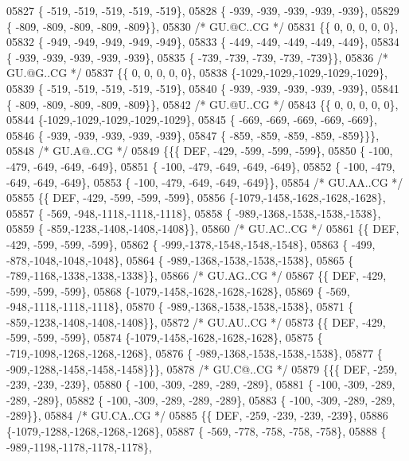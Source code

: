 \begin{DoxyCode}
05827 \{ -519, -519, -519, -519, -519\},
05828 \{ -939, -939, -939, -939, -939\},
05829 \{ -809, -809, -809, -809, -809\}\},
05830 \textcolor{comment}{/* GU.@C..CG */}
05831 \{\{    0,    0,    0,    0,    0\},
05832 \{ -949, -949, -949, -949, -949\},
05833 \{ -449, -449, -449, -449, -449\},
05834 \{ -939, -939, -939, -939, -939\},
05835 \{ -739, -739, -739, -739, -739\}\},
05836 \textcolor{comment}{/* GU.@G..CG */}
05837 \{\{    0,    0,    0,    0,    0\},
05838 \{-1029,-1029,-1029,-1029,-1029\},
05839 \{ -519, -519, -519, -519, -519\},
05840 \{ -939, -939, -939, -939, -939\},
05841 \{ -809, -809, -809, -809, -809\}\},
05842 \textcolor{comment}{/* GU.@U..CG */}
05843 \{\{    0,    0,    0,    0,    0\},
05844 \{-1029,-1029,-1029,-1029,-1029\},
05845 \{ -669, -669, -669, -669, -669\},
05846 \{ -939, -939, -939, -939, -939\},
05847 \{ -859, -859, -859, -859, -859\}\}\},
05848 \textcolor{comment}{/* GU.A@..CG */}
05849 \{\{\{  DEF, -429, -599, -599, -599\},
05850 \{ -100, -479, -649, -649, -649\},
05851 \{ -100, -479, -649, -649, -649\},
05852 \{ -100, -479, -649, -649, -649\},
05853 \{ -100, -479, -649, -649, -649\}\},
05854 \textcolor{comment}{/* GU.AA..CG */}
05855 \{\{  DEF, -429, -599, -599, -599\},
05856 \{-1079,-1458,-1628,-1628,-1628\},
05857 \{ -569, -948,-1118,-1118,-1118\},
05858 \{ -989,-1368,-1538,-1538,-1538\},
05859 \{ -859,-1238,-1408,-1408,-1408\}\},
05860 \textcolor{comment}{/* GU.AC..CG */}
05861 \{\{  DEF, -429, -599, -599, -599\},
05862 \{ -999,-1378,-1548,-1548,-1548\},
05863 \{ -499, -878,-1048,-1048,-1048\},
05864 \{ -989,-1368,-1538,-1538,-1538\},
05865 \{ -789,-1168,-1338,-1338,-1338\}\},
05866 \textcolor{comment}{/* GU.AG..CG */}
05867 \{\{  DEF, -429, -599, -599, -599\},
05868 \{-1079,-1458,-1628,-1628,-1628\},
05869 \{ -569, -948,-1118,-1118,-1118\},
05870 \{ -989,-1368,-1538,-1538,-1538\},
05871 \{ -859,-1238,-1408,-1408,-1408\}\},
05872 \textcolor{comment}{/* GU.AU..CG */}
05873 \{\{  DEF, -429, -599, -599, -599\},
05874 \{-1079,-1458,-1628,-1628,-1628\},
05875 \{ -719,-1098,-1268,-1268,-1268\},
05876 \{ -989,-1368,-1538,-1538,-1538\},
05877 \{ -909,-1288,-1458,-1458,-1458\}\}\},
05878 \textcolor{comment}{/* GU.C@..CG */}
05879 \{\{\{  DEF, -259, -239, -239, -239\},
05880 \{ -100, -309, -289, -289, -289\},
05881 \{ -100, -309, -289, -289, -289\},
05882 \{ -100, -309, -289, -289, -289\},
05883 \{ -100, -309, -289, -289, -289\}\},
05884 \textcolor{comment}{/* GU.CA..CG */}
05885 \{\{  DEF, -259, -239, -239, -239\},
05886 \{-1079,-1288,-1268,-1268,-1268\},
05887 \{ -569, -778, -758, -758, -758\},
05888 \{ -989,-1198,-1178,-1178,-1178\},

\end{DoxyCode}
